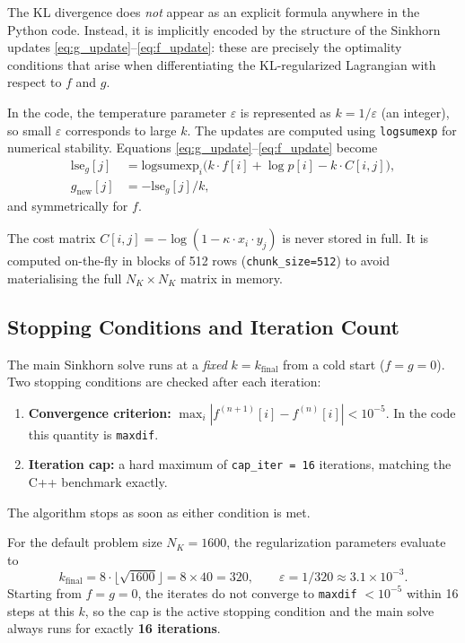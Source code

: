 \documentclass{article}
\begin{document}
The KL divergence does \emph{not} appear as an explicit formula anywhere in the Python code. Instead, it is implicitly encoded by the structure of the Sinkhorn updates \eqref{eq:g_update}--\eqref{eq:f_update}: these are precisely the optimality conditions that arise when differentiating the KL-regularized Lagrangian with respect to $f$ and $g$.

In the code, the temperature parameter $\varepsilon$ is represented as $k = 1/\varepsilon$ (an integer), so small $\varepsilon$ corresponds to large $k$. The updates are computed using \texttt{logsumexp} for numerical stability. Equations \eqref{eq:g_update}--\eqref{eq:f_update} become
\begin{align}
    \mathrm{lse}_g[j] &= \mathrm{logsumexp}_i\!\bigl(k \cdot f[i] + \log p[i] - k \cdot C[i,j]\bigr), \\
    g_{\mathrm{new}}[j] &= -\mathrm{lse}_g[j]/k,
\end{align}
and symmetrically for $f$.

The cost matrix $C[i,j] = -\log(1 - \kappa \cdot x_i \cdot y_j)$ is never stored in full. It is computed on-the-fly in blocks of 512 rows (\texttt{chunk\_size=512}) to avoid materialising the full $N_K \times N_K$ matrix in memory.

\subsection{Stopping Conditions and Iteration Count}

The main Sinkhorn solve runs at a \emph{fixed} $k = k_{\mathrm{final}}$ from a cold start ($f = g = 0$). Two stopping conditions are checked after each iteration:
\begin{enumerate}
    \item \textbf{Convergence criterion:} $\max_i |f^{(n+1)}[i] - f^{(n)}[i]| < 10^{-5}$. In the code this quantity is \texttt{maxdif}.
    \item \textbf{Iteration cap:} a hard maximum of \texttt{cap\_iter = 16} iterations, matching the C++ benchmark exactly.
\end{enumerate}
The algorithm stops as soon as either condition is met.

For the default problem size $N_K = 1600$, the regularization parameters evaluate to
\begin{equation}
    k_{\mathrm{final}} = 8 \cdot \lfloor\sqrt{1600}\rfloor = 8 \times 40 = 320,
    \qquad
    \varepsilon = 1/320 \approx 3.1 \times 10^{-3}.
\end{equation}
Starting from $f = g = 0$, the iterates do not converge to \texttt{maxdif} $< 10^{-5}$ within 16 steps at this $k$, so the cap is the active stopping condition and the main solve always runs for exactly \textbf{16 iterations}.
\end{document}
